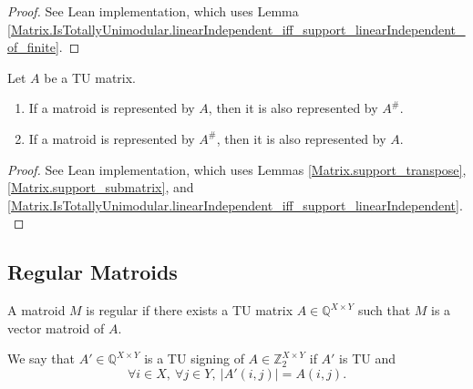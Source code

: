 \begin{proof}
    \leanok
    See Lean implementation, which uses Lemma \ref{Matrix.IsTotallyUnimodular.linearIndependent_iff_support_linearIndependent_of_finite}.
\end{proof}

\begin{lemma}
    \label{Matrix.IsTotallyUnimodular.toMatroid_eq_support_toMatroid}
    \leanok
    Let $A$ be a TU matrix.
    \begin{enumerate}
        \item If a matroid is represented by $A$, then it is also represented by $A^{\#}$.
        \item If a matroid is represented by $A^{\#}$, then it is also represented by $A$.
    \end{enumerate}
\end{lemma}

\begin{proof}
    \leanok
    See Lean implementation, which uses Lemmas \ref{Matrix.support_transpose}, \ref{Matrix.support_submatrix}, and \ref{Matrix.IsTotallyUnimodular.linearIndependent_iff_support_linearIndependent}.
\end{proof}


\subsection{Regular Matroids}

\begin{definition}
    \label{Matroid.IsRegular}
    \leanok
    A matroid $M$ is regular if there exists a TU matrix $A \in \mathbb{Q}^{X \times Y}$ such that $M$ is a vector matroid of $A$.
\end{definition}

\begin{definition}
    \label{Matrix.IsTuSigningOf}
    \leanok
    We say that $A' \in \mathbb{Q}^{X \times Y}$ is a TU signing of $A \in \mathbb{Z}_{2}^{X \times Y}$ if $A'$ is TU and
    \[
        \forall i \in X, \ \forall j \in Y, \ |A' (i, j)| = A (i, j).
    \]
\end{definition}

